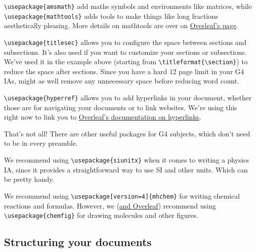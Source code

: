 \verb|\usepackage{amsmath}| add maths symbols and environments like matrices,
while\\ \verb|\usepackage{mathtools}| adds tools to make things like long fractions aesthetically pleasing.
More details on mathtools are over on
\href{https://www.overleaf.com/learn/latex/Articles/Mathtools_-_for_beautiful_math}{Overleaf's page}.

\verb|\usepackage{titlesec}| allows you to configure the space between sections and subsections.
It's also used if you want to customize your sections or subsections.
We've used it in the example above (starting from \verb|\titleformat{\section}|)
to reduce the space after sections.
Since you have a hard 12 page limit in your G4 IAs,
might as well remove any unnecessary space before reducing word count.

\verb|\usepackage{hyperref}| allows you to add hyperlinks in your document,
whether those are for navigating your documents or to link websites.
We're using this right now to link you to
\href{https://www.overleaf.com/learn/latex/Hyperlinks}{Overleaf's documentation on hyperlinks}.

That's not all! There are other useful packages for G4 subjects,
which don't need to be in every preamble.

We recommend using \verb|\usepackage{siunitx}| when it comes to writing a physics IA,
since it provides a straightforward way to use SI and other units.
Which can be pretty handy.

We recommend using \verb|\usepackage[version=4]{mhchem}| for writing chemical reactions and formulas.
However, we (\href{https://www.overleaf.com/learn/latex/Chemistry_formulae}{and Overleaf})
recommend using \verb|\usepackage{chemfig}| for drawing molecules and other figures.

\subsection{Structuring your documents}

